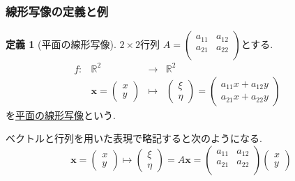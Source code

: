 \documentclass[dvipdfmx,a4paper,11pt]{article}
\newcommand{\R}{\mathbb{R}}
\theoremstyle{definition}
\newtheorem{dfn}[thm]{定義}
\begin{document}
\subsubsection{線形写像の定義と例}
 \begin{tcolorbox}[
    colback = white,
    colframe = green!35!black,
    fonttitle = \bfseries,
    breakable = true]
    \begin{dfn}[平面の線形写像]
    \label{dfn-plane-linear}
   $2 \times 2$行列
$
A=\begin{pmatrix}
a_{11}& a_{12}\\
a_{21}& a_{22} \\
\end{pmatrix}
$とする. 
 $$
\begin{array}{ccccc}
f: &\R^2& \rightarrow & \R^2& \\
&
\bm{x}
=
\begin{pmatrix}
x \\ y
 \end{pmatrix} & \longmapsto & 
  \begin{pmatrix}
\xi  \\ \eta
 \end{pmatrix}
  =
 \begin{pmatrix}
a_{11}x + a_{12}y \\ a_{21}x + a_{22}y
 \end{pmatrix}
 &
\end{array}
$$
を\underline{平面の線形写像}という.

ベクトルと行列を用いた表現で略記すると次のようになる.
$$
\bm{x}
=
\begin{pmatrix}
x \\ y
 \end{pmatrix} 
 \longmapsto  
  \begin{pmatrix}
\xi  \\ \eta
 \end{pmatrix}
  =
 A \bm{x}
  = 
 \begin{pmatrix}
a_{11} &  a_{12} \\ a_{21} & a_{22} \\
 \end{pmatrix}
 \begin{pmatrix}
x \\ y
 \end{pmatrix} 
$$
\end{dfn}
 \end{tcolorbox}
 
\end{document}
